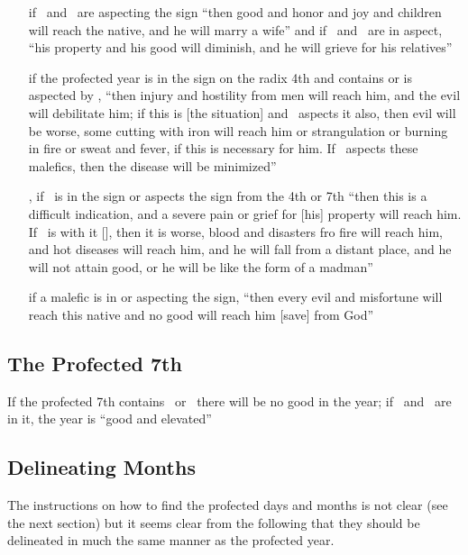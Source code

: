 \begin{itemize}[topsep=0em,itemsep=0em]
\item[\ASC]  if \Jupiter\, and \Venus\, are aspecting the sign ``then good and honor and joy and children will reach the native, and he will marry a wife'' and if \Saturn\, and \Mars\, are in aspect, ``his property and his good will diminish, and he will grieve for his relatives''


\item[\IC] if the profected year is in the sign on the radix 4th and contains or is aspected by \Saturn, ``then injury and hostility from men will reach him, and the evil will debilitate him; if this is [the situation] and \Mars\, aspects it also, then evil will be worse, some cutting with iron will reach him or strangulation or burning in fire or sweat and fever, if this is necessary for him. If \Jupiter\, aspects these malefics, then the disease will be minimized''

\item[\IC,\DSC] if \Saturn\, is in the sign or aspects the sign from the 4th or 7th  ``then this is a difficult indication, and a severe pain or grief for [his] property will reach him. If \Mars\, is with it [\Saturn], then it is worse, blood and disasters fro fire will reach him, and hot diseases will reach him, and he will fall from a distant place, and he will not attain good, or he will be like the form of a madman''

\item[\MC]  if a malefic is in or aspecting the sign, ``then every evil and misfortune will reach this native and no good will reach him [save] from God''
\end{itemize}

\subsection{The Profected 7th}
If the profected 7th contains \Saturn\, or \Mars\, there will be no good in the year; if \Jupiter\, and \Venus\, are in it, the year is ``good and elevated''

\subsection{Delineating Months}
The instructions on how to find the profected days and months is not clear (see the next section) but it seems clear from the following that they should be delineated in much the same manner as the profected year. 

